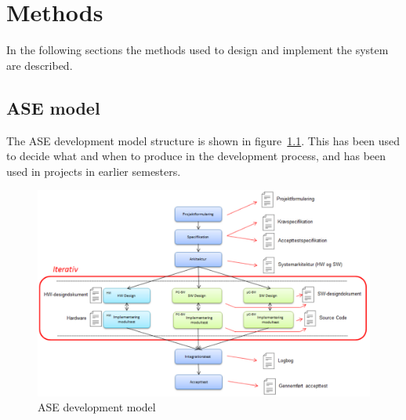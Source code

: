 \chapter{Methods}
In the following sections the methods used to design and implement the system are described.

\section{ASE model}

The ASE development model structure is shown in figure~\ref{fig:ASE_model}. This has been used to decide what and when to produce in the development process, and has been used in projects in earlier semesters. 

\begin{figure}[H]
	\centering
	\includegraphics[max width=1\linewidth]{ASE_model.png}
	\caption{ASE development model\cite{ASE_model}}
	\label{fig:ASE_model}
\end{figure}

